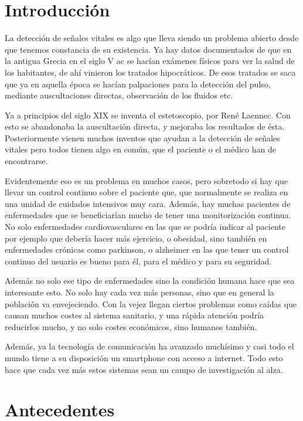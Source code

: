\documentclass[12pt]{article}
\numberwithin{equation}{section}
\begin{document}
\section{Introducción}

La detección de señales vitales es algo que lleva siendo un problema abierto desde que tenemos constancia de su existencia. Ya hay datos documentados de que en la antigua Grecia en el siglo V ac se hacían exámenes físicos para ver la salud de los habitantes, de ahí vinieron los tratados hipocráticos. De esos tratados se saca que ya en aquella época se hacían palpaciones para la detección del pulso, mediante auscultaciones  directas, observación de los fluidos etc.

Ya a principios del siglo XIX se inventa el estetoscopio, por  René Laennec. Con esto se abandonaba la auscultación directa, y mejoraba los resultados de ésta. Posteriormente vienen muchos inventos que ayudan a la detección de señales vitales pero todos tienen algo en común, que el paciente o el médico han de encontrarse.

Evidentemente eso es un problema en muchos casos, pero sobretodo si hay que llevar un control continuo sobre el paciente que, que normalmente se realiza en una unidad de cuidados intensivos muy cara. Además, hay muchas pacientes de enfermedades que se beneficiarían mucho de tener una monitorización continua. No solo enfermedades cardiovasculares en las que se podría indicar al paciente por ejemplo que debería hacer más ejercicio, o obesidad, sino también en enfermedades crónicas como parkinson, o alzheimer en las que tener un control continuo del usuario es bueno para él, para el médico y para su seguridad.

Además no solo ese tipo de enfermedades sino la condición humana hace que sea interesante esto. No solo hay cada vez más personas, sino que en general la población va envejeciendo. Con la vejez llegan ciertos problemas como caídas que causan muchos costes al sistema sanitario, y una rápida atención podría reducirlos mucho, y no solo costes económicos, sino humanos también.

Además, ya la tecnología de comunicación ha avanzado muchísimo y casi todo el mundo tiene a su disposición un smartphone con acceso a internet. Todo esto hace que cada vez más estos sistemas sean un campo de investigación al alza.

\newpage
\section{Antecedentes}
\end{document}
